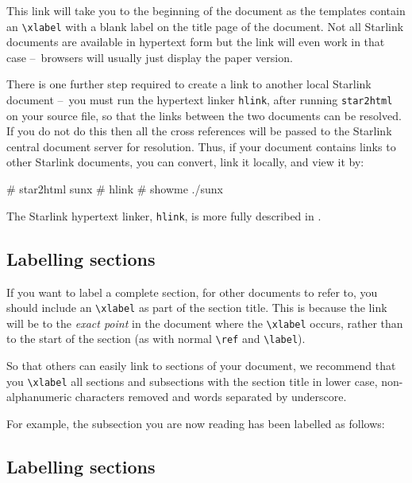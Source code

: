 \documentclass[twoside,11pt,nolof]{starlink}
\providecommand{\dash}{--}
\begin{document}
This link will take you to the beginning of the document as the templates
contain an \verb#\xlabel# with a blank label on the title page of the document.
Not all Starlink documents are available in hypertext form but the link will
even work in that case \dash\  browsers will usually just display the paper
version.

There is one further step required to create a link to another local
Starlink document \dash\ you must run the hypertext linker \texttt{hlink},
after running \texttt{star2html} on your source file, so that the links
between the two documents can be resolved. If you do not do this then all the
cross references will be passed to the Starlink central document server for
resolution.
Thus, if your document contains links to other Starlink documents, you
can convert, link it locally, and view it by:

\begin{terminalv}
# star2html sunx
# hlink
# showme ./sunx
\end{terminalv}

The Starlink hypertext linker, \texttt{hlink}, is more fully described in
.

\subsection{\label{labelling_sections}Labelling sections}

If you want to label a complete section, for other documents to refer to,
you should include an \verb+\xlabel+ as part of the section title.
This is because the link will be to the \emph{exact point}\/ in the document
where the \verb#\xlabel# occurs, rather than to the start of the
section (as with normal \verb#\ref# and \verb#\label#).

So that others can easily link to sections of your document,
we recommend that you \verb+\xlabel+ all sections and subsections
with the section title in lower case, non-alphanumeric characters removed and
words separated by underscore.

For example, the subsection you are now reading has been labelled as follows:

\begin{terminalv}
\subsection{Labelling sections}
\end{terminalv}
\end{document}
